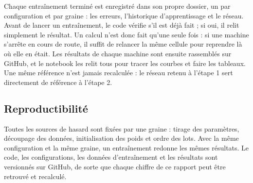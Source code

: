 Chaque entraînement terminé est enregistré dans son propre dossier, un par configuration et par graine :
les erreurs, l'historique d'apprentissage et le réseau. Avant de lancer un entraînement, le code vérifie s'il est
déjà fait ; si oui, il relit simplement le résultat. Un calcul n'est donc fait qu'une seule fois : si une machine
s'arrête en cours de route, il suffit de relancer la même cellule pour reprendre là où elle en était. Les résultats
de chaque machine sont ensuite rassemblés sur GitHub, et le notebook les relit tous pour tracer les courbes et
faire les tableaux. Une même référence n'est jamais recalculée : le réseau retenu à l'étape 1 sert directement de
référence à l'étape 2.

\subsection{Reproductibilité}

Toutes les sources de hasard sont fixées par une graine : tirage des paramètres, découpage des données,
initialisation des poids et ordre des lots. Avec la même configuration et la même graine, un entraînement redonne
les mêmes résultats. Le code, les configurations, les données d'entraînement et les résultats sont versionnés sur
GitHub, de sorte que chaque chiffre de ce rapport peut être retrouvé et recalculé.
